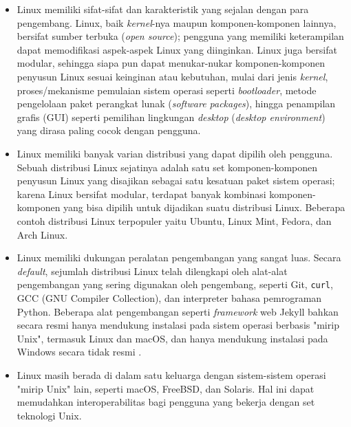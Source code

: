\begin{itemize}[leftmargin=1.5cm] %
    \item Linux memiliki sifat-sifat dan karakteristik yang sejalan dengan para pengembang. Linux, baik \textit{kernel}-nya maupun komponen-komponen lainnya, bersifat sumber terbuka (\textit{open source}); pengguna yang memiliki keterampilan dapat memodifikasi aspek-aspek Linux yang diinginkan. Linux juga bersifat modular, sehingga siapa pun dapat menukar-nukar komponen-komponen penyusun Linux sesuai keinginan atau kebutuhan, mulai dari jenis \textit{kernel}, proses/mekanisme pemulaian sistem operasi seperti \textit{bootloader}, metode pengelolaan paket perangkat lunak (\textit{software packages}), hingga penampilan grafis (GUI) seperti pemilihan lingkungan \textit{desktop} (\textit{desktop environment}) yang dirasa paling cocok dengan pengguna.

    \item Linux memiliki banyak varian distribusi yang dapat dipilih oleh pengguna. Sebuah distribusi Linux sejatinya adalah satu set komponen-komponen penyusun Linux yang disajikan sebagai satu kesatuan paket sistem operasi; karena Linux bersifat modular, terdapat banyak kombinasi komponen-komponen yang bisa dipilih untuk dijadikan suatu distribusi Linux. Beberapa contoh distribusi Linux terpopuler yaitu Ubuntu, Linux Mint, Fedora, dan Arch Linux.

    \item Linux memiliki dukungan peralatan pengembangan yang sangat luas. Secara \textit{default}, sejumlah distribusi Linux telah dilengkapi oleh alat-alat pengembangan yang sering digunakan oleh pengembang, seperti Git, \verb|curl|, GCC (GNU Compiler Collection), dan interpreter bahasa pemrograman Python. Beberapa alat pengembangan seperti \textit{framework} web Jekyll bahkan secara resmi hanya mendukung instalasi pada sistem operasi berbasis "mirip Unix", termasuk Linux dan macOS, dan hanya mendukung instalasi pada Windows secara tidak resmi \cite{jekyll-windows-unofficially-supported}.

    \item Linux masih berada di dalam satu keluarga dengan sistem-sistem operasi "mirip Unix" lain, seperti macOS, FreeBSD, dan Solaris. Hal ini dapat memudahkan interoperabilitas bagi pengguna yang bekerja dengan set teknologi Unix.
\end{itemize}

